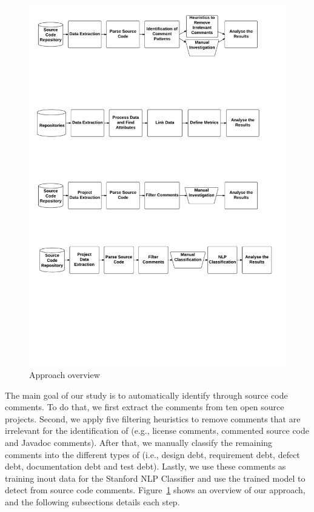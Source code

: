 \begin{figure}[thb!]
  \centering
  \includegraphics[width=1\textwidth]{figures/approach.pdf}
  \caption{Approach overview}
  \label{fig:approach}
\end{figure}

The main goal of our study is to automatically identify \SATD through source code comments. To do that, we first extract the comments from ten open source projects. Second, we apply five filtering heuristics to remove comments that are irrelevant for the identification of \SATD  (e.g., license comments, commented source code and Javadoc comments). After that, we manually classify the remaining comments into the different types of \SATD (i.e., design debt, requirement debt, defect debt, documentation debt and test debt). Lastly, we use these comments as training inout data for the Stanford NLP Classifier and use the trained model to detect \SATD from source code comments. Figure~\ref{fig:approach} shows an overview of our approach, and the following subsections details each step.

